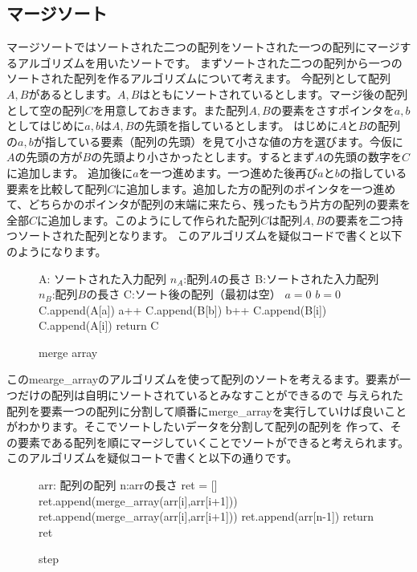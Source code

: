 \documentclass[dvipdfmx,pic,eepic,ecltree]{jarticle}
\begin{document}
\subsection{マージソート}
マージソートではソートされた二つの配列をソートされた一つの配列にマージするアルゴリズムを用いたソートです。
まずソートされた二つの配列から一つのソートされた配列を作るアルゴリズムについて考えます。
今配列として配列$A,B$があるとします。$A,B$はともにソートされているとします。マージ後の配列として空の配列$C$を用意しておきます。また配列$A,B$の要素をさすポインタを$a,b$としてはじめに$a,b$は$A,B$の先頭を指しているとします。
はじめに$A$と$B$の配列の$a,b$が指している要素（配列の先頭）を見て小さな値の方を選びます。今仮に$A$の先頭の方が$B$の先頭より小さかったとします。するとまず$A$の先頭の数字を$C$に追加します。
追加後に$a$を一つ進めます。一つ進めた後再び$a$と$b$の指している要素を比較して配列$C$に追加します。追加した方の配列のポインタを一つ進めて、どちらかのポインタが配列の末端に来たら、残ったもう片方の配列の要素を
全部$C$に追加します。このようにして作られた配列$C$は配列$A,B$の要素を二つ持つソートされた配列となります。
このアルゴリズムを疑似コードで書くと以下のようになります。
\begin{figure}[H]
\begin{algorithm}[H]
	\caption{merge array}
	\label{merge array}
	\begin{algorithmic}[1] 
	\STATE A: ソートされた入力配列
	\STATE $n_A$:配列$A$の長さ
	\STATE B:ソートされた入力配列
	\STATE $n_B$:配列$B$の長さ
	\STATE C:ソート後の配列（最初は空）
	\STATE $a=0$
	\STATE $b=0$
	\STATE C.append(A[a])
	\STATE a++
	\ELSE
	\STATE C.append(B[b])
	\STATE b++
	\ENDIF
	\ENDWHILE
	\STATE C.append(B[i])
	\ENDFOR
	\ELSE
	\STATE C.append(A[i])
	\ENDFOR
	\ENDIF
	\STATE return C
	\end{algorithmic}
\end{algorithm}
\end{figure}
このmearge\_arrayのアルゴリズムを使って配列のソートを考えるます。要素が一つだけの配列は自明にソートされているとみなすことができるので
与えられた配列を要素一つの配列に分割して順番にmerge\_arrayを実行していけば良いことがわかります。そこでソートしたいデータを分割して配列の配列を
作って、その要素である配列を順にマージしていくことでソートができると考えられます。このアルゴリズムを疑似コートで書くと以下の通りです。
\begin{figure}[H]
\begin{algorithm}[H]
	\caption{step}
	\label{step}
	\begin{algorithmic}[1] 
	\STATE arr: 配列の配列
	\STATE n:arrの長さ
	\STATE ret = []
	\STATE ret.append(merge\_array(arr[i],arr[i+1]))
	\ENDFOR
	\ELSE
	\STATE ret.append(merge\_array(arr[i],arr[i+1]))
	\ENDFOR
	\STATE ret.append(arr[n-1])
	\ENDIF
	\STATE return ret
	\end{algorithmic}
\end{algorithm}
\end{figure}
\end{document}

